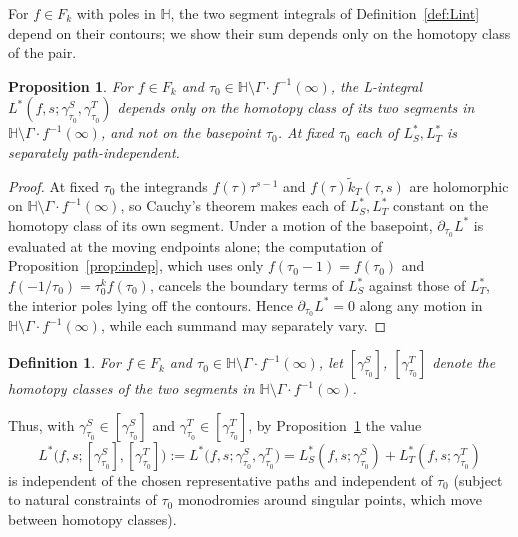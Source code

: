 \documentclass[11pt]{article}
\newtheorem{proposition}[theorem]{Proposition}
\newtheorem{definition}[theorem]{Definition}
\newcommand{\HH}{\mathbb{H}}
\newcommand{\tk}{\widetilde{k}_T}
\begin{document}
For $f\in F_k$ with poles in $\HH$, the two segment integrals of Definition~\ref{def:Lint} depend
on their contours; we show their sum depends only on the homotopy class of the pair.

\begin{proposition}\label{prop:indepHomotopy_arc}
For $f\in F_k$ and $\tau_0\in\HH\setminus\Gamma\!\cdot\!f^{-1}(\infty)$, the L-integral
$L^*(f,s;\gamma^S_{\tau_0},\gamma^T_{\tau_0})$ depends only on the homotopy class of its
two segments in $\HH\setminus\Gamma\!\cdot\!f^{-1}(\infty)$, and not on the basepoint
$\tau_0$. At fixed $\tau_0$ each of $L^*_S,L^*_T$ is separately path-independent.
\end{proposition}

\begin{proof}
At fixed $\tau_0$ the integrands $f(\tau)\tau^{s-1}$ and $f(\tau)\tk(\tau,s)$ are
holomorphic on $\HH\setminus\Gamma\!\cdot\!f^{-1}(\infty)$, so Cauchy's theorem makes each
of $L^*_S,L^*_T$ constant on the homotopy class of its own segment. Under a motion of the
basepoint, $\partial_{\tau_0}L^*$ is evaluated at the moving endpoints alone; the
computation of Proposition~\ref{prop:indep}, which uses only $f(\tau_0-1)=f(\tau_0)$ and
$f(-1/\tau_0)=\tau_0^{k}f(\tau_0)$, cancels the boundary terms of $L^*_S$ against those
of $L^*_T$, the interior poles lying off the contours. Hence $\partial_{\tau_0}L^*=0$ along
any motion in $\HH\setminus\Gamma\!\cdot\!f^{-1}(\infty)$, while each summand may
separately vary.
\end{proof}

\begin{definition}\label{def:class_arc}
For $f\in F_k$ and $\tau_0\in\HH\setminus\Gamma\!\cdot\!f^{-1}(\infty)$, let
$[\gamma^S_{\tau_0}]$, $[\gamma^T_{\tau_0}]$ denote the homotopy classes of the two
segments in $\HH\setminus\Gamma\!\cdot\!f^{-1}(\infty)$.
\end{definition}

Thus, with $\gamma^S_{\tau_0} \in [\gamma^S_{\tau_0}]$ and
$\gamma^T_{\tau_0} \in [\gamma^T_{\tau_0}]$, by Proposition~\ref{prop:indepHomotopy_arc}
the value
\begin{equation}\label{eq:Lclass_arc}
L^*\big(f,s;[\gamma^S_{\tau_0}],[\gamma^T_{\tau_0}]\big)
:= L^*\big(f,s;\gamma^S_{\tau_0} , \gamma^T_{\tau_0}\big)
= L^*_S(f,s;\gamma^S_{\tau_0}) + L^*_T(f,s;\gamma^T_{\tau_0})
\end{equation}
is independent of the chosen representative paths and independent of $\tau_0$ (subject to
natural constraints of $\tau_0$ monodromies around singular points, which move between
homotopy classes).
\end{document}
